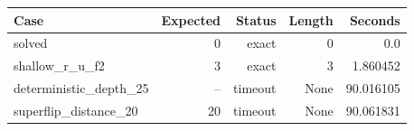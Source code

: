 {\small
\begin{tabular}{lrrrr}
\hline
Case & Expected & Status & Length & Seconds \\
\hline
solved & 0 & exact & 0 & 0.0 \\
shallow\_r\_u\_f2 & 3 & exact & 3 & 1.860452 \\
deterministic\_depth\_25 & -- & timeout & None & 90.016105 \\
superflip\_distance\_20 & 20 & timeout & None & 90.061831 \\
\hline
\end{tabular}
}
